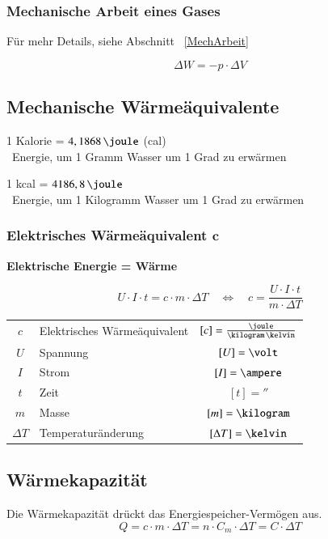 \subsubsection{Mechanische Arbeit eines Gases}

Für mehr Details, siehe Abschnitt ~\ref{MechArbeit}

$$  \boxed{\Delta W = -p \cdot \Delta V } $$


\subsection{Mechanische Wärmeäquivalente}

1 Kalorie = $4,1868 \, \joule$ (cal) \\
\textrightarrow\ Energie, um 1 Gramm Wasser um 1 Grad zu erwärmen

\medskip

1 kcal = $4186,8 \, \joule$ \\
\textrightarrow\ Energie, um 1 Kilogramm Wasser um 1 Grad zu erwärmen


\subsubsection{Elektrisches Wärmeäquivalent $\bm{c}$}

\textbf{Elektrische Energie = Wärme}

$$ \boxed{ U \cdot I \cdot t = c \cdot m \cdot \Delta T \quad \Leftrightarrow \quad c = \frac{U \cdot I \cdot t}{m \cdot \Delta T} } $$


\begin{tabular}{c l c}
	$c$ 		& Elektrisches Wärmeäquivalent	& $[c] = \frac{\joule}{\kilogram \, \kelvin}$		\\
	$U$ 		& Spannung			 			& $[U] = \volt$ 									\\
	$I$ 		& Strom 						& $[I] = \ampere$ 									\\
	$t$ 		& Zeit 							& $[t] = \second$			 						\\
	$m$ 		& Masse 						& $[m] = \kilogram$ 								\\
	$\Delta T$ 	& Temperaturänderung 			& $[\Delta T] = \kelvin$
\end{tabular}


\subsection{Wärmekapazität}

Die Wärmekapazität drückt das Energiespeicher-Vermögen aus.
$$ \boxed{ Q = c \cdot m \cdot \Delta T = n \cdot C_m \cdot \Delta T = C \cdot \Delta T } $$


